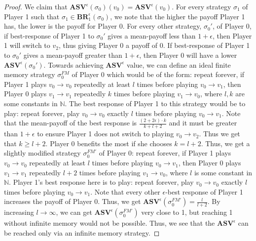 \begin{proof}
We claim that $\mathbf{ASV}^{\epsilon}(\sigma_0)(v_0) = \mathbf{ASV}^{\epsilon}(v_0)$. For every strategy $\sigma_1$ of Player 1 such that $\sigma_1 \in \mathbf{BR}_1^{\epsilon}(\sigma_0)$, we note that the higher the payoff Player 1 has, the lower is the payoff for Player 0. For every other strategy, $\sigma_0'$, of Player 0, if best-response of Player 1 to $\sigma_0'$ gives a mean-payoff less than $1+\epsilon$, then Player 1 will switch to $v_2$, thus giving Player 0 a payoff of 0. If best-response of Player 1 to $\sigma_0'$ gives a mean-payoff greater than $1+\epsilon$, then Player 0 will have a lower $\mathbf{ASV}^{\epsilon}(\sigma_0')$. Towards achieving $\mathbf{ASV}^{\epsilon}$ value, we can define an ideal finite memory strategy $\sigma_0^{FM}$ of Player 0 which would be of the form: repeat forever, if Player 1 plays $v_0 \to v_0$ repeatedly at least $l$ times before playing $v_0 \to v_1$, then Player 0 plays $v_1 \to v_1$ repeatedly $k$ times before playing $v_1 \to v_0$, where $l, k$ are some constants in $\mathbb{N}$. The best response of Player 1 to this strategy would be to play: repeat forever, play $v_0 \to v_0$ exactly $l$ times before playing $v_0 \to v_1$. Note that the mean-payoff of the best response is $\frac{(2+2\epsilon)\cdot k}{k + l + 2}$ and it must be greater than $1 + \epsilon$ to ensure Player 1 does not switch to playing $v_0 \to v_2$. Thus we get that $k \geqslant l + 2$. Player 0 benefits the most if she chooses $k = l+2$. Thus, we get a slightly modified strategy $\sigma_0^{FM'}$ of Player 0: repeat forever, if Player 1 plays $v_0 \to v_0$ repeatedly at least $l$ times before playing $v_0 \to v_1$, then Player 0 plays $v_1 \to v_1$ repeatedly $l+2$ times before playing $v_1 \to v_0$, where $l$ is  some constant in $\mathbb{N}$. Player 1's best response here is to play: repeat forever, play $v_0 \to v_0$ exactly $l$ times before playing $v_0 \to v_1$. Note that every other $\epsilon$-best response of Player 1 increases the payoff of Player 0. Thus, we get $\mathbf{ASV}^{\epsilon}(\sigma_0^{FM'}) = \frac{l}{l+2}$. By increasing $l \to \infty$, we can get $\mathbf{ASV}^{\epsilon}(\sigma_0^{FM'})$ very close to 1, but reaching 1 without infinite memory would not be possible. Thus, we see that the $\mathbf{ASV}^{\epsilon}$ can be reached only via an infinite memory strategy.
\end{proof}